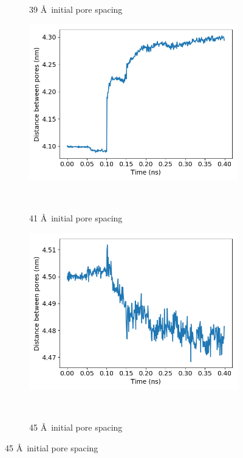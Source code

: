\documentclass{article}
\begin{document}
\begin{figure}[!htb]
\begin{subfigure}{0.3\textwidth}
		\vspace{-1.25em}
		\caption{39 \AA~initial pore spacing}~\label{fig:p2p_39}
	\end{subfigure}
	\begin{subfigure}{0.3\textwidth}
		\includegraphics[width=\textwidth]{p2p_41.png}\quad
		\vspace{-1.25em}
		\caption{41 \AA~initial pore spacing}~\label{fig:p2p_41}
	\end{subfigure}
	\begin{subfigure}{0.3\textwidth}
		\includegraphics[width=\textwidth]{p2p_45.png}
		\vspace{-1.25em}
		\caption{45 \AA~initial pore spacing}~\label{fig:p2p_45}
	\end{subfigure}

\end{figure}
\end{document}
